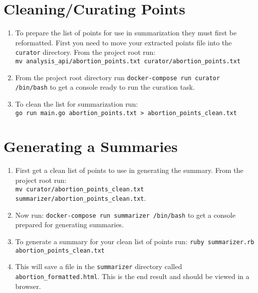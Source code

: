 \section{Cleaning/Curating Points}
\begin{enumerate}
	\item{To prepare the list of points for use in summarization they must first be reformatted. First you need to move your extracted points file into the \texttt{curator} directory. From the project root run: \\ \texttt{mv analysis\_api/abortion\_points.txt curator/abortion\_points.txt}}
	\item{From the project root directory run \texttt{docker-compose run curator /bin/bash} to get a console ready to run the curation task.}
	\item{To clean the list for summarization run: \\ \texttt{go run main.go abortion\_points.txt > abortion\_points\_clean.txt}}
\end{enumerate}

\section{Generating a Summaries}
\begin{enumerate}
	\item{First get a clean list of points to use in generating the summary. From the project root run: \\ \texttt{mv curator/abortion\_points\_clean.txt summarizer/abortion\_points\_clean.txt}.}
	\item{Now run: \texttt{docker-compose run summarizer /bin/bash} to get a console prepared for generating summaries.}
	\item{To generate a summary for your clean list of points run: \texttt{ruby summarizer.rb abortion\_points\_clean.txt}}
	\item{This will save a file in the \texttt{summarizer} directory called \texttt{abortion\_formatted.html}. This is the end result and should be viewed in a browser.}
\end{enumerate}

